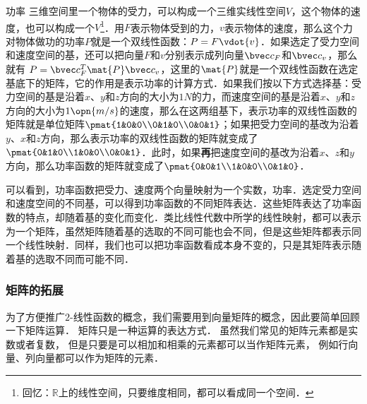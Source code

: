 \begin{example}{功率}
三维空间里一个物体的受力，可以构成一个三维实线性空间$V$，这个物体的速度，也可以构成一个$V$\footnote{回忆：$\mathbb{R}$上的线性空间，只要维度相同，都可以看成同一个空间．}．用${F}$表示物体受到的力，${v}$表示物体的速度，那么这个力对物体做功的功率$P$就是一个双线性函数：$P={F}\vdot{v}$．如果选定了受力空间和速度空间的基，还可以把向量${F}$和${v}$分别表示成列向量$\bvec c_F$和$\bvec c_v$，那么就有 $P=\bvec c^T_F\mat {P}\bvec c_v$，这里的$\mat{P}$就是一个双线性函数在选定基底下的矩阵，它的作用是表示功率的计算方式．如果我们按以下方式选择基：受力空间的基是沿着$x$、$y$和$z$方向的大小为$1N$的力，而速度空间的基是沿着$x$、$y$和$z$方向的大小为$1\opn{m/s}$的速度，那么在这两组基下，表示功率的双线性函数的矩阵就是单位矩阵$\pmat{1&0&0\\0&1&0\\0&0&1}$；如果把受力空间的基改为沿着$y$、$x$和$z$方向，那么表示功率的双线性函数的矩阵就变成了$\pmat{0&1&0\\1&0&0\\0&0&1}$．此时，如果\textbf{再}把速度空间的基改为沿着$x$、$z$和$y$方向，那么功率函数的矩阵就变成了$\pmat{0&0&1\\1&0&0\\0&1&0}$．
\end{example}

可以看到，功率函数把受力、速度两个向量映射为一个实数，功率．选定受力空间和速度空间的不同基，可以得到功率函数的不同矩阵表达．这些矩阵表达了功率函数的特点，却随着基的变化而变化．类比线性代数中所学的线性映射，都可以表示为一个矩阵，虽然矩阵随着基的选取的不同可能也会不同，但是这些矩阵都表示同一个线性映射．同样，我们也可以把功率函数看成本身不变的，只是其矩阵表示随着基的选取不同而可能不同．

\subsubsection{矩阵的拓展}

为了方便推广$2$-线性函数的概念，我们需要用到向量矩阵的概念，因此要简单回顾一下矩阵运算． 矩阵只是一种运算的表达方式． 虽然我们常见的矩阵元素都是实数或者复数， 但是只要是可以相加和相乘的元素都可以当作矩阵元素， 例如行向量、列向量都可以作为矩阵的元素．

